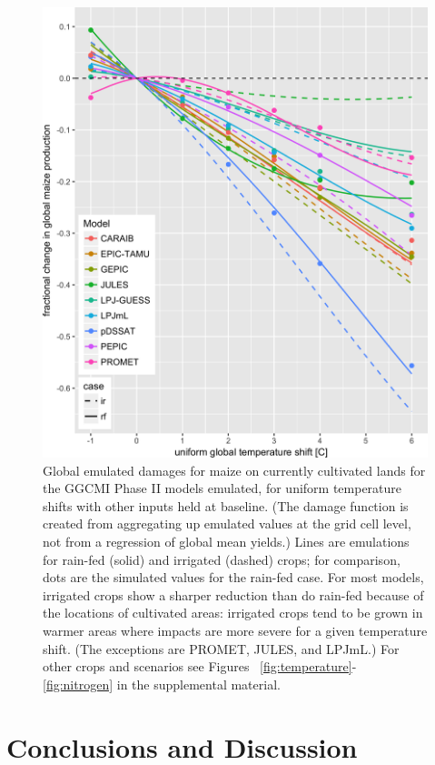 \documentclass[preprint, 5p, times, twocolumn]{elsarticle}
\begin{document}
\begin{figure}[!htb]
    \centering
    \includegraphics[width=0.95\linewidth]{figures/global_em_maize.png}
    \caption{Global emulated damages for maize on currently cultivated lands for the GGCMI Phase II models emulated, for uniform temperature shifts with other inputs held at baseline. (The damage function is created from aggregating up emulated values at the grid cell level, not from a regression of global mean yields.) Lines are emulations for rain-fed (solid) and irrigated (dashed) crops; for comparison, dots are the simulated values for the rain-fed case.  For most models, irrigated crops show a sharper reduction than do rain-fed because of the locations of cultivated areas: irrigated crops tend to be grown in warmer areas where impacts are more severe for a given temperature shift. (The exceptions are PROMET, JULES, and LPJmL.) For other crops and scenarios see Figures ~\ref{fig:temperature}- \ref{fig:nitrogen} in the supplemental material.}
    \label{fig:globe_em}
\end{figure}

\section{Conclusions and Discussion} 
\label{S:6}
\end{document}
